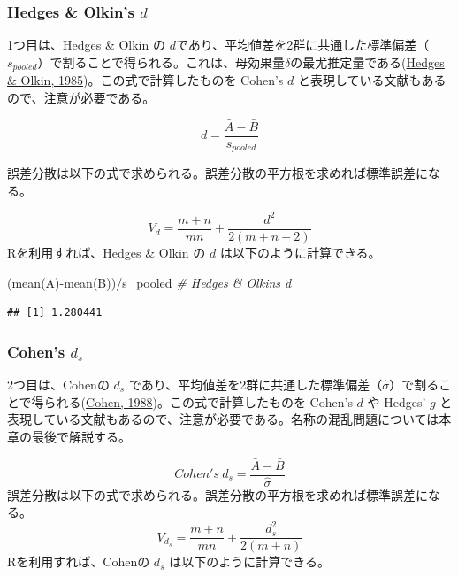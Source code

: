 \documentclass[
  ja=standard, xelatex, base=12pt]{bxjsreport}
\newenvironment{Shaded}{\begin{snugshade}}{\end{snugshade}}
\newcommand{\CommentTok}[1]{\textcolor[rgb]{0.56,0.35,0.01}{\textit{#1}}}
\newcommand{\FunctionTok}[1]{\textcolor[rgb]{0.00,0.00,0.00}{#1}}
\newcommand{\NormalTok}[1]{#1}
\newcommand{\SpecialCharTok}[1]{\textcolor[rgb]{0.00,0.00,0.00}{#1}}
\begin{document}
\hypertarget{hedges-olkins-d-1}{%
\subsubsection{\texorpdfstring{Hedges \& Olkin's \(d\)}{Hedges \& Olkin's d}}\label{hedges-olkins-d-1}}

1つ目は、Hedges \& Olkin の \(d\)であり、平均値差を2群に共通した標準偏差（\(s_{pooled}\)）で割ることで得られる。これは、母効果量\(\delta\)の最尤推定量である(\protect\hyperlink{ref-hedges1985}{Hedges \& Olkin, 1985})。この式で計算したものを Cohen's \(d\) と表現している文献もあるので、注意が必要である。

\[
d =\frac{\bar{A}-\bar{B}}{s_{pooled}} 
\]

誤差分散は以下の式で求められる。誤差分散の平方根を求めれば標準誤差になる。

\[
V_d=\frac{m+n}{mn}+\frac{d^2}{2(m+n-2)}
\] Rを利用すれば、Hedges \& Olkin の \(d\) は以下のように計算できる。

\begin{Shaded}
\begin{Highlighting}[]
\NormalTok{(}\FunctionTok{mean}\NormalTok{(A)}\SpecialCharTok{{-}}\FunctionTok{mean}\NormalTok{(B))}\SpecialCharTok{/}\NormalTok{s\_pooled  }\CommentTok{\# Hedges \& Olkin\textquotesingle{}s d}
\end{Highlighting}
\end{Shaded}

\begin{verbatim}
## [1] 1.280441
\end{verbatim}

\hypertarget{cohens-d_s-2}{%
\subsubsection{\texorpdfstring{Cohen's \(d_s\)}{Cohen's d\_s}}\label{cohens-d_s-2}}

2つ目は、Cohenの \(d_s\) であり、平均値差を2群に共通した標準偏差（\(\hat\sigma\)）で割ることで得られる(\protect\hyperlink{ref-cohen1988}{Cohen, 1988})。この式で計算したものを Cohen's \(d\) や Hedges' \(g\) と表現している文献もあるので、注意が必要である。名称の混乱問題については本章の最後で解説する。

\[
Cohen's~d_s =\frac{\bar{A}-\bar{B}}{\hat\sigma} 
\] 誤差分散は以下の式で求められる。誤差分散の平方根を求めれば標準誤差になる。 \[
V_{d_s}=\frac{m+n}{mn}+\frac {d_s^2}{2(m+n)} 
\] Rを利用すれば、Cohenの \(d_s\) は以下のように計算できる。
\end{document}
